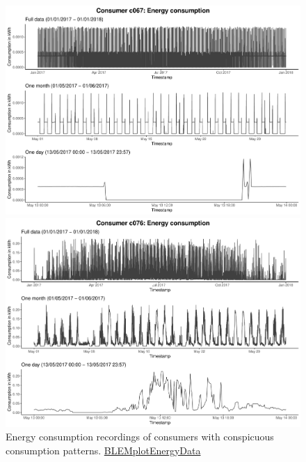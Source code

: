 \begin{figure}
    \begin{minipage}[ht]{\dimexpr.5\textheight-0.15em}
    \includegraphics[width=\textwidth]{thesis/graphs/timeseries/c067_cons.pdf}
    \end{minipage}
    \begin{minipage}[ht]{\dimexpr.5\textheight-0.15em}
    \includegraphics[width=\textwidth]{thesis/graphs/timeseries/c076_cons.pdf}
    \end{minipage}
    
    \caption[Energy consumption recordings of consumers with conspicuous consumption patterns]{Energy consumption recordings of consumers with conspicuous consumption patterns. \quantnet\href{ }{BLEMplotEnergyData}}
    \label{Fig:consenergycons_peculiar}
\end{figure}

